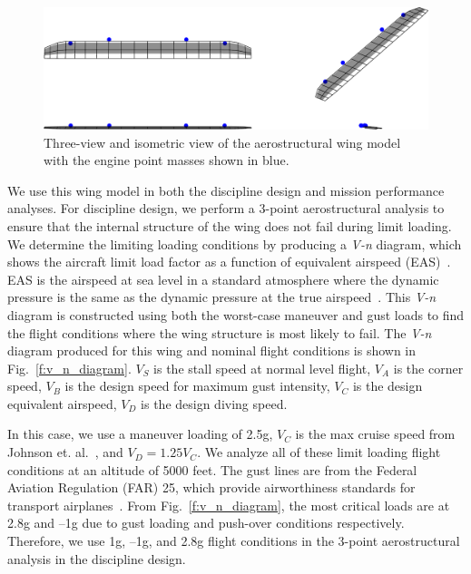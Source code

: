 \begin{figure}[h]
\begin{center}
 \includegraphics[width=1.0\textwidth]{../Images/aerostruct_wing}
 \caption{Three-view and isometric view of the aerostructural wing model with the engine point masses shown in blue.}
 \label{f:OAS_wing}
\end{center}
\end{figure}

We use this wing model in both the discipline design and mission performance analyses.
For discipline design, we perform a 3-point aerostructural analysis to ensure that the internal structure of the wing does not fail during limit loading.
We determine the limiting loading conditions by producing a \textit{V-n} diagram, which shows the aircraft limit load factor as a function of equivalent airspeed (EAS)~\cite{Raymer2012}.
EAS is the airspeed at sea level in a standard atmosphere where the dynamic pressure is the same as the dynamic pressure at the true airspeed~\cite{Raymer2012}.
This \textit{V-n} diagram is constructed using both the worst-case maneuver and gust loads to find the flight conditions where the wing structure is most likely to fail.
The \textit{V-n} diagram produced for this wing and nominal flight conditions is shown in Fig.~\ref{f:v_n_diagram}.
$V_S$ is the stall speed at normal level flight, $V_A$ is the corner speed, $V_B$ is the design speed for maximum gust intensity, $V_C$ is the design equivalent airspeed, $V_D$ is the design diving speed.

In this case, we use a maneuver loading of 2.5g, $V_C$ is the max cruise speed from Johnson et. al.~\cite{johnson2018concept}, and $V_D = 1.25 V_C$.
We analyze all of these limit loading flight conditions at an altitude of 5000 feet.
The gust lines are from the Federal Aviation Regulation (FAR) 25, which provide airworthiness standards for transport airplanes~\cite{far25}.
From Fig.~\ref{f:v_n_diagram}, the most critical loads are at 2.8g and --1g due to gust loading and push-over conditions respectively.
Therefore, we use 1g, --1g, and 2.8g flight conditions in the 3-point aerostructural analysis in the discipline design.

